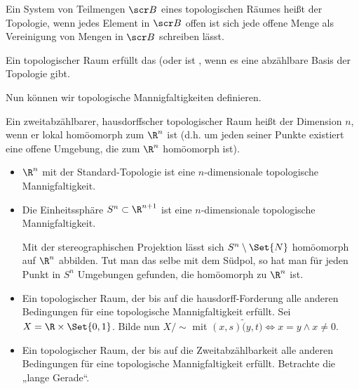 \begin{df} \label{1.3} %
    Ein System von Teilmengen $\scr B$ eines topologischen Räumes heißt  der Topologie, wenn jedes Element in $\scr B$ offen ist sich jede offene Menge als Vereinigung von Mengen in $\scr B$ schreiben lässt.

    Ein topologischer Raum erfüllt das  (oder ist , wenn es eine abzählbare Basis der Topologie gibt.
\end{df}

Nun können wir topologische Mannigfaltigkeiten definieren.

\begin{df} \label{1.4} %
    Ein zweitabzählbarer, hausdorffscher topologischer Raum heißt  der Dimension $n$, wenn
    er lokal homöomorph zum $\R^n$ ist (d.h. um jeden seiner Punkte existiert eine offene Umgebung, die zum $\R^n$ homöomorph ist).
\end{df}

\begin{ex*}
    \begin{itemize}
        \item
            $\R^n$ mit der Standard-Topologie ist eine $n$-dimensionale topologische Mannigfaltigkeit.
        \item
            Die Einheitssphäre $S^n \subset \R^{n+1}$ ist eine $n$-dimensionale topologische Mannigfaltigkeit.

            Mit der stereographischen Projektion lässt sich $S^n \setminus \Set{N}$ homöomorph auf $\R^n$ abbilden.
            Tut man das selbe mit dem Südpol, so hat man für jeden Punkt in $S^n$ Umgebungen gefunden, die homöomorph zu $\R^n$ ist.
        \item
            Ein topologischer Raum, der bis auf die hausdorff-Forderung alle anderen Bedingungen für eine topologische Mannigfaltigkeit erfüllt.
            Sei $X = \R \times \Set{0, 1}$.
            Bilde nun $X / \sim$ mit $(x,s) \tilde (y, t) \iff x = y \land x \neq 0$.
        \item
            Ein topologischer Raum, der bis auf die Zweitabzählbarkeit alle anderen Bedingungen für eine topologische Mannigfaltigkeit erfüllt.
            Betrachte die „lange Gerade“.
    \end{itemize}
\end{ex*}



